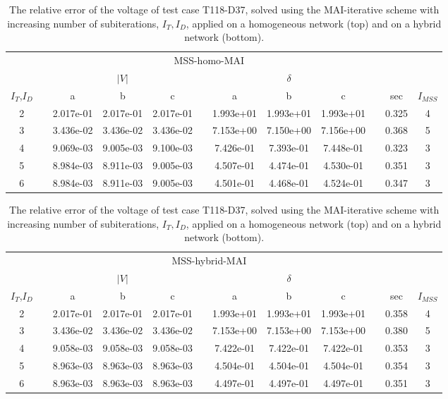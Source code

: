 \begin{table}
\renewcommand{\arraystretch}{1.3}
\centering
\caption{The relative error of the voltage of test case T118-D37, solved using the MAI-iterative scheme with increasing number of subiterations, $I_T, I_D$, applied on a homogeneous network (top) and on a hybrid network (bottom).}\label{tab:MAIschemes}
\begin{adjustbox}{width=1\textwidth} %
\small
\begin{tabular}{cccccccccccc}
\toprule
{} && \multicolumn{7}{c}{MSS-homo-MAI} && &  \\
\cmidrule{3-9}
{} && \multicolumn{3}{c}{$|V|$} && \multicolumn{3}{c}{$\delta$} && \\
\cmidrule{3-5}\cmidrule{7-9}
{$I_T$,$I_D$} &&        a &        b &       c &&        a &       b &        c && sec & $I_{MSS}$\\
\midrule
2 &&  2.017e-01 &  2.017e-01 &  2.017e-01 &&  1.993e+01 &  1.993e+01 &  1.993e+01 && 0.325 & 4 \\
3 &&  3.436e-02 &  3.436e-02 &  3.436e-02 &&  7.153e+00 &  7.150e+00 &  7.156e+00 && 0.368 & 5 \\
4 &&  9.069e-03 &  9.005e-03 &  9.100e-03 &&  7.426e-01 &  7.393e-01 &  7.448e-01 && 0.323 & 3\\
5 &&  8.984e-03 &  8.911e-03 &  9.005e-03 &&  4.507e-01 &  4.474e-01 &  4.530e-01 && 0.351 & 3\\
6 &&  8.984e-03 &  8.911e-03 &  9.005e-03 &&  4.501e-01 &  4.468e-01 &  4.524e-01 && 0.347 & 3\\
\bottomrule
\end{tabular}
\end{adjustbox}
\begin{adjustbox}{width=1\textwidth} %
\small
\begin{tabular}{cccccccccccc}
\toprule
{} && \multicolumn{7}{c}{MSS-hybrid-MAI} && &  \\
\cmidrule{3-9}
{} && \multicolumn{3}{c}{$|V|$} && \multicolumn{3}{c}{$\delta$} && \\
\cmidrule{3-5}\cmidrule{7-9}
{$I_T$,$I_D$} &&        a &        b &       c &&        a &       b &        c && sec & $I_{MSS}$\\
\midrule
2 &&  2.017e-01 &  2.017e-01 &  2.017e-01 &&  1.993e+01 &  1.993e+01 &  1.993e+01 && 0.358 & 4 \\
3 &&  3.436e-02 &  3.436e-02 &  3.436e-02 &&  7.153e+00 &  7.153e+00 &  7.153e+00 && 0.380& 5\\
4 &&  9.058e-03 &  9.058e-03 &  9.058e-03 &&  7.422e-01 &  7.422e-01 &  7.422e-01 && 0.353& 3\\
5 &&  8.963e-03 &  8.963e-03 &  8.963e-03 &&  4.504e-01 &  4.504e-01 &  4.504e-01 && 0.354& 3 \\
6 &&  8.963e-03 &  8.963e-03 &  8.963e-03 &&  4.497e-01 &  4.497e-01 &  4.497e-01 && 0.351&3\\
\bottomrule
\end{tabular}
\end{adjustbox}

\end{table}
